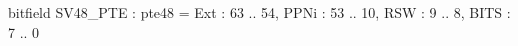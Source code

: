 bitfield SV48_PTE : pte48 = {
  Ext   : 63 .. 54,
  PPNi  : 53 .. 10,
  RSW   : 9  .. 8,
  BITS  : 7  .. 0
}
